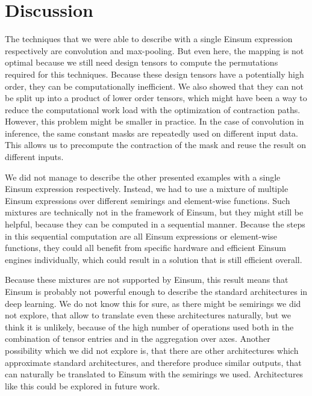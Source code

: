 \section{Discussion}

The techniques that we were able to describe with a single Einsum expression respectively are convolution and max-pooling.
But even here, the mapping is not optimal because we still need design tensors to compute the permutations required for this techniques.
Because these design tensors have a potentially high order, they can be computationally inefficient.
We also showed that they can not be split up into a product of lower order tensors, which might have been a way to reduce the computational work load with the optimization of contraction paths.
However, this problem might be smaller in practice.
In the case of convolution in inference, the same constant masks are repeatedly used on different input data.
This allows us to precompute the contraction of the mask and reuse the result on different inputs.

We did not manage to describe the other presented examples with a single Einsum expression respectively.
Instead, we had to use a mixture of multiple Einsum expressions over different semirings and element-wise functions.
Such mixtures are technically not in the framework of Einsum, but they might still be helpful,
because they can be computed in a sequential manner.
Because the steps in this sequential computation are all Einsum expressions or element-wise functions,
they could all benefit from specific hardware and efficient Einsum engines individually,
which could result in a solution that is still efficient overall.

Because these mixtures are not supported by Einsum, this result means that Einsum is probably not powerful enough to describe the standard architectures in deep learning.
We do not know this for sure, as there might be semirings we did not explore, that allow to translate even these architectures naturally,
but we think it is unlikely, because of the high number of operations used both in the combination of tensor entries and in the aggregation over axes.
Another possibility which we did not explore is, that there are other architectures which approximate standard architectures, and therefore produce similar outputs, that can naturally be translated to Einsum with the semirings we used.
Architectures like this could be explored in future work.
